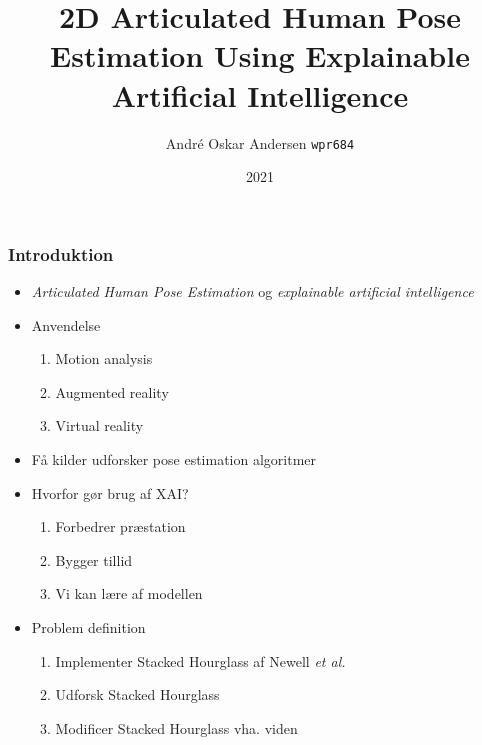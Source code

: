 \documentclass{beamer}
\begin{document}
\title{2D Articulated Human Pose Estimation
\newline \small Using Explainable Artificial Intelligence}

\author{André Oskar Andersen
\newline \small \texttt{wpr684}}


\date{2021}

\frame{\titlepage}

\begin{frame}
    \frametitle{Introduktion}
    \begin{minipage}{0.5\textwidth}
        \begin{itemize}
          \item<2-> \textit{Articulated Human Pose Estimation} og \textit{explainable artificial intelligence}
          \item<3-> Anvendelse
          \begin{enumerate}
              \item Motion analysis
              \item Augmented reality
              \item Virtual reality
          \end{enumerate}
          \item <4-> Få kilder udforsker pose estimation algoritmer
        \end{itemize}
      \end{minipage} \hfill
      \begin{minipage}{0.45\textwidth}
        \begin{itemize}
            \item <5-> Hvorfor gør brug af XAI?
            \begin{enumerate}
                \item Forbedrer præstation
                \item Bygger tillid
                \item Vi kan lære af modellen
            \end{enumerate}
            \item<6-> Problem definition
            \begin{enumerate}
                \item Implementer Stacked Hourglass af Newell \textit{et al.}
                \item Udforsk Stacked Hourglass
                \item Modificer Stacked Hourglass vha. viden
            \end{enumerate}
        \end{itemize}
      \end{minipage}
\end{frame}
\end{document}
